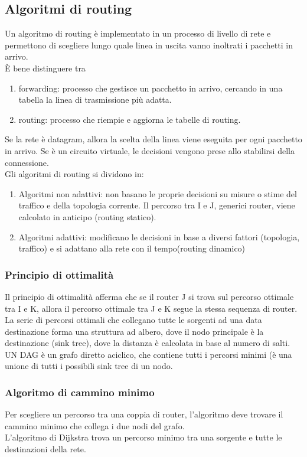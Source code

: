 \documentclass{article}
\begin{document}
\subsection{Algoritmi di routing}
Un algoritmo di routing è implementato in un processo di livello di rete e permettono di scegliere lungo quale linea in uscita vanno inoltrati i pacchetti in arrivo. \\
È bene distinguere tra
\begin{enumerate}
    \item forwarding: processo che gestisce un pacchetto in arrivo, cercando in una tabella la linea di trasmissione più adatta. 
    \item routing: processo che riempie e aggiorna le tabelle di routing.
\end{enumerate}
Se la rete è datagram, allora la scelta della linea viene eseguita per ogni pacchetto in arrivo. Se è un circuito virtuale, le decisioni vengono prese allo stabilirsi della connessione. \\
Gli algoritmi di routing si dividono in:
\begin{enumerate}
    \item Algoritmi non adattivi: non basano le proprie decisioni su misure o stime del traffico e della topologia corrente. Il percorso tra I e J, generici router, viene calcolato in anticipo (routing statico).
    \item Algoritmi adattivi: modificano le decisioni in base a diversi fattori (topologia, traffico) e si adattano alla rete con il tempo(routing dinamico)
\end{enumerate}
\subsubsection{Principio di ottimalità}
Il principio di ottimalità afferma che se il router J si trova sul percorso ottimale tra I e K, allora il percorso ottimale tra J e K segue la stessa sequenza di router.
La serie di percorsi ottimali che collegano tutte le sorgenti ad una data destinazione forma una struttura ad albero, dove il nodo principale è la destinazione (sink tree), dove la distanza è calcolata in base al numero di salti.\\
UN DAG è un grafo diretto aciclico, che contiene tutti i percorsi minimi (è una unione di tutti i possibili sink tree di un nodo.\\ 
\subsubsection{Algoritmo di cammino minimo}
Per scegliere un percorso tra una coppia di router, l'algoritmo deve trovare il cammino minimo che collega i due nodi del grafo.\\
L'algoritmo di Dijkstra trova un percorso minimo tra una sorgente e tutte le destinazioni della rete. 
\end{document}
